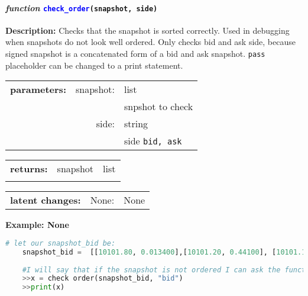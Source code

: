 \paragraph{\textit{function} \textcolor{blue}{\texttt{check\_order}}\texttt{(snapshot, side)}}\hfill\break
\noindent \textbf{Description:} Checks that the snapshot is sorted correctly. Used in debugging when snapshots do not look well ordered. Only checks bid and ask side, because signed snapshot is a concatenated form of a bid and ask snapshot. \texttt{pass} placeholder can be changed to a print statement. 

\begin{tabular}{r r l }
	\textbf{parameters:}	& snapshot: & list\\
	&  & snpshot to check\\
	& side:& string \\
	&& side \texttt{bid, ask}	
\end{tabular}

\begin{tabular}{l c l}
	\textbf{returns:} & snapshot & list\\
	& & 
\end{tabular}

\begin{tabular}{l c l}
	\textbf{latent changes:} & None: & None\\
\end{tabular}

\textbf{Example: None}
\begin{lstlisting}[language=Python]
	# let our snapshot_bid be:
	snapshot_bid =  [[10101.80, 0.013400],[10101.20, 0.44100], [10101.10, 0.450541]]
	
	#I will say that if the snapshot is not ordered I can ask the function to return a boolean, True if ordered, else False
	>>x = check order(snapshot_bid, "bid")
	>>print(x)
\end{lstlisting}